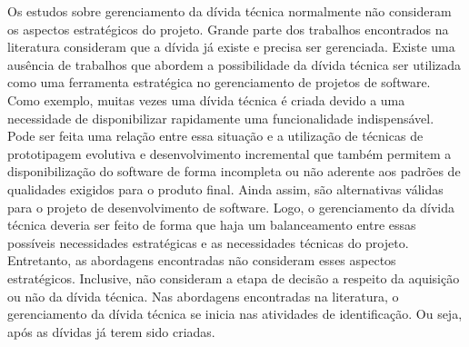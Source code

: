 Os estudos sobre gerenciamento da dívida técnica normalmente não consideram os aspectos estratégicos do projeto. Grande parte dos trabalhos encontrados na literatura consideram que a dívida já existe e precisa ser gerenciada. Existe uma ausência de trabalhos que abordem a possibilidade da dívida técnica ser utilizada como uma ferramenta  estratégica no gerenciamento de projetos de software. Como exemplo, muitas vezes uma dívida técnica é criada devido a uma necessidade  de disponibilizar rapidamente uma funcionalidade indispensável.  Pode ser feita uma relação entre essa situação e a utilização de técnicas de prototipagem evolutiva e desenvolvimento incremental que também permitem a disponibilização do software de forma incompleta ou não aderente aos padrões de qualidades exigidos para o produto final. Ainda assim,   são alternativas válidas para o projeto de desenvolvimento de software.  Logo, o gerenciamento da dívida técnica deveria ser feito de forma que haja um balanceamento entre essas possíveis  necessidades estratégicas e as necessidades técnicas do projeto. Entretanto, as abordagens encontradas não consideram esses aspectos estratégicos. Inclusive, não consideram a etapa de decisão a respeito da aquisição ou não da dívida técnica. Nas abordagens encontradas na literatura\cite{seaman2011measuring,guo2011portfolio,fernandez2015analysis}, o gerenciamento da dívida técnica se inicia nas atividades de identificação. Ou seja, após as dívidas já terem sido criadas. 










